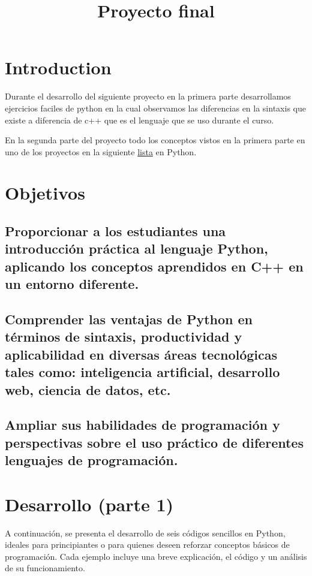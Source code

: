 \documentclass{article}
\title{Proyecto final}
\begin{document}
\maketitle
\section{Introduction}

Durante el desarrollo del siguiente proyecto en la primera parte desarrollamos ejercicios faciles de python en la cual observamos las diferencias en la sintaxis que existe a diferencia de c++ que es el lenguaje que se uso durante el curso.

En la segunda parte del proyecto todo los conceptos vistos en la primera parte en uno de los proyectos en la siguiente \href{https://www.freecodecamp.org/espanol/news/25-proyectos-en-python-para-principiantes/}{lista} en Python.

\section{Objetivos}

\subsection{Proporcionar a los estudiantes una introducción práctica al lenguaje Python, aplicando los conceptos aprendidos en C++ en un entorno diferente.
}
\subsection{Comprender las ventajas de Python en términos de sintaxis, productividad y aplicabilidad en diversas áreas tecnológicas tales como: inteligencia artificial, desarrollo web, ciencia de datos, etc.
}
\subsection{Ampliar sus habilidades de programación y perspectivas sobre el uso práctico de diferentes lenguajes de programación.
}

\section{Desarrollo (parte 1)}

A continuación, se presenta el desarrollo de seis códigos sencillos en Python, ideales para principiantes o para quienes deseen reforzar conceptos básicos de programación. Cada ejemplo incluye una breve explicación, el código y un análisis de su funcionamiento. 
\end{document}
